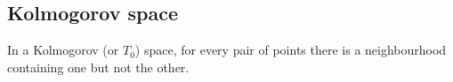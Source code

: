 
\subsection{Kolmogorov space}

In a Kolmogorov (or \(T_0\)) space, for every pair of points there is a neighbourhood containing one but not the other.

